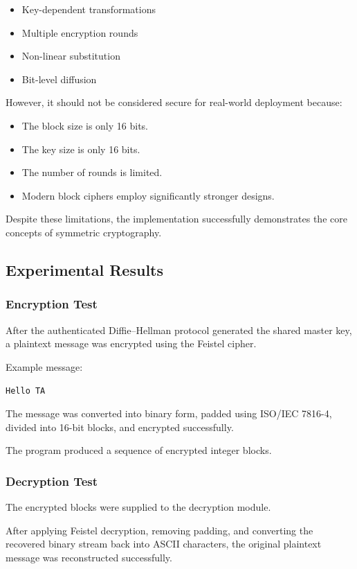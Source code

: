 \documentclass[12pt]{article}
\begin{document}
\begin{itemize}
\item Key-dependent transformations
\item Multiple encryption rounds
\item Non-linear substitution
\item Bit-level diffusion
\end{itemize}

However, it should not be considered secure for real-world deployment because:

\begin{itemize}
\item The block size is only 16 bits.
\item The key size is only 16 bits.
\item The number of rounds is limited.
\item Modern block ciphers employ significantly stronger designs.
\end{itemize}

Despite these limitations, the implementation successfully demonstrates the core concepts of symmetric cryptography.

\subsection{Experimental Results}

\subsubsection{Encryption Test}

After the authenticated Diffie--Hellman protocol generated the shared master key, a plaintext message was encrypted using the Feistel cipher.

Example message:

\texttt{Hello TA}

The message was converted into binary form, padded using ISO/IEC 7816-4, divided into 16-bit blocks, and encrypted successfully.

The program produced a sequence of encrypted integer blocks.

\subsubsection{Decryption Test}

The encrypted blocks were supplied to the decryption module.

After applying Feistel decryption, removing padding, and converting the recovered binary stream back into ASCII characters, the original plaintext message was reconstructed successfully.
\end{document}
